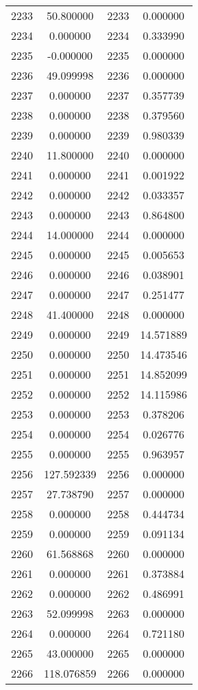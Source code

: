 \documentclass[12pt]{article}
\begin{document}
\begin{longtable}{@{}cccc@{}}
2233 & 50.800000 & 2233 & 0.000000 \\
2234 & 0.000000 & 2234 & 0.333990 \\
2235 & -0.000000 & 2235 & 0.000000 \\
2236 & 49.099998 & 2236 & 0.000000 \\
2237 & 0.000000 & 2237 & 0.357739 \\
2238 & 0.000000 & 2238 & 0.379560 \\
2239 & 0.000000 & 2239 & 0.980339 \\
2240 & 11.800000 & 2240 & 0.000000 \\
2241 & 0.000000 & 2241 & 0.001922 \\
2242 & 0.000000 & 2242 & 0.033357 \\
2243 & 0.000000 & 2243 & 0.864800 \\
2244 & 14.000000 & 2244 & 0.000000 \\
2245 & 0.000000 & 2245 & 0.005653 \\
2246 & 0.000000 & 2246 & 0.038901 \\
2247 & 0.000000 & 2247 & 0.251477 \\
2248 & 41.400000 & 2248 & 0.000000 \\
2249 & 0.000000 & 2249 & 14.571889 \\
2250 & 0.000000 & 2250 & 14.473546 \\
2251 & 0.000000 & 2251 & 14.852099 \\
2252 & 0.000000 & 2252 & 14.115986 \\
2253 & 0.000000 & 2253 & 0.378206 \\
2254 & 0.000000 & 2254 & 0.026776 \\
2255 & 0.000000 & 2255 & 0.963957 \\
2256 & 127.592339 & 2256 & 0.000000 \\
2257 & 27.738790 & 2257 & 0.000000 \\
2258 & 0.000000 & 2258 & 0.444734 \\
2259 & 0.000000 & 2259 & 0.091134 \\
2260 & 61.568868 & 2260 & 0.000000 \\
2261 & 0.000000 & 2261 & 0.373884 \\
2262 & 0.000000 & 2262 & 0.486991 \\
2263 & 52.099998 & 2263 & 0.000000 \\
2264 & 0.000000 & 2264 & 0.721180 \\
2265 & 43.000000 & 2265 & 0.000000 \\
2266 & 118.076859 & 2266 & 0.000000 \\

\end{longtable}
\end{document}
